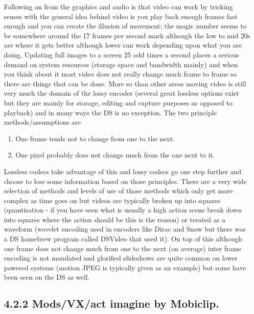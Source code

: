 \documentclass[
]{book}
\providecommand{\tightlist}{%
  \setlength{\itemsep}{0pt}\setlength{\parskip}{0pt}}
\begin{document}
Following on from the graphics and audio is that video can work by tricking senses with the general idea behind video is you play back enough frames fast enough and you can create the illusion of movement; the magic number seems to be somewhere around the 17 frames per second mark although the low to mid 20s are where it gets better although lower can work depending upon what you are doing. Updating full images to a screen 25 odd times a second places a serious demand on system resources (storage space and bandwidth mainly) and when you think about it most video does not really change much frame to frame so there are things that can be done. More so than other areas moving video is still very much the domain of the lossy encoder (several great lossless options exist but they are mainly for storage, editing and capture purposes as opposed to playback) and in many ways the DS is no exception. The two principle methods/assumptions are

\begin{enumerate}
\def\labelenumi{\arabic{enumi}.}
\tightlist
\item
  One frame tends not to change from one to the next.
\item
  One pixel probably does not change much from the one next to it.
\end{enumerate}

Lossless codecs take advantage of this and lossy codecs go one step further and choose to lose some information based on those principles. There are a very wide selection of methods and levels of use of those methods which only get more complex as time goes on but videos are typically broken up into squares (quantisation - if you have seen what is usually a high action scene break down into squares where the action should be this is the reason) or treated as a waveform (wavelet encoding used in encoders like Dirac and Snow but there was a DS homebrew program called DSVideo that used it). On top of this although one frame does not change much from one to the next (on average) inter frame encoding is not mandated and glorified slideshows are quite common on lower powered systems (motion JPEG is typically given as an example) but some have been seen on the DS as well.

\hypertarget{modsvxact-imagine-by-mobiclip.}{%
\subsection{4.2.2 Mods/VX/act imagine by Mobiclip.}\label{modsvxact-imagine-by-mobiclip.}}
\end{document}
